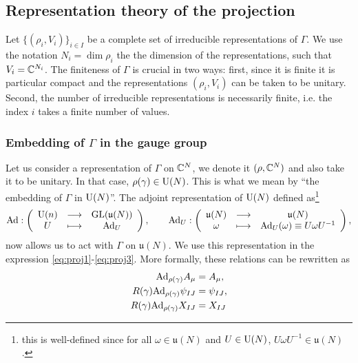 


    \subsection{Representation theory of the projection}

        Let $\{(\rho_i,V_i)\}_{i\in I}$ be a complete set of irreducible representations of $\Gamma$. We use the notation $N_i=\dim\rho_i$ the the dimension of the representations, such that $V_i=\mathbb{C}^{N_i}$. The finiteness of $\Gamma$ is crucial in two ways: first, since it is finite it is particular compact and the representations $(\rho_i,V_i)$ can be taken to be unitary. Second, the number of irreducible representations is necessarily finite, i.e. the index $i$ takes a finite number of values. 
        
        \subsubsection{Embedding of $\Gamma$ in the gauge group}

            Let us consider a representation of $\Gamma$ on $\mathbb{C}^N$, we denote it $(\rho,\mathbb{C}^N)$ and also take it to be unitary. In that case, $\rho(\gamma)\in\text{U}(N)$. This is what we mean by ``the embedding of $\Gamma$ in $\text{U}(N)$''. The adjoint representation of $\text{U}(N)$ defined as\footnote{this is well-defined since for all $\omega\in\mathfrak{u}(N)$ and $U\in\text{U}(N)$, $U\omega U^{-1}\in\mathfrak{u}(N)$.}
            \begin{equation}
                \text{Ad}:\left(
                \begin{array}{ccc}
                    \text{U}(n) & \longrightarrow & \text{GL}(\mathfrak{u}(N)) \\
                    U & \longmapsto & \text{Ad}_U
                \end{array}
                \right),\qquad
                \text{Ad}_U:\left(
                \begin{array}{ccc}
                    \mathfrak{u}(N) & \longrightarrow & \mathfrak{u}(N) \\
                    \omega & \longmapsto & \text{Ad}_U(\omega)\equiv U\omega U^{-1}
                \end{array}
                \right),
            \end{equation}
            now allows us to act with $\Gamma$ on $\mathfrak{u}(N)$. We use this representation in the expression \eqref{eq:proj1}-\eqref{eq:proj3}. More formally, these relations can be rewritten as
            \begin{align}
                \text{Ad}_{\rho(\gamma)}A_\mu  &= A_\mu,\\
                R(\gamma)\text{Ad}_{\rho(\gamma)}\psi_{IJ}  &= \psi_{IJ},\\
                R(\gamma)\text{Ad}_{\rho(\gamma)}X_{IJ} &= X_{IJ}
            \end{align}

